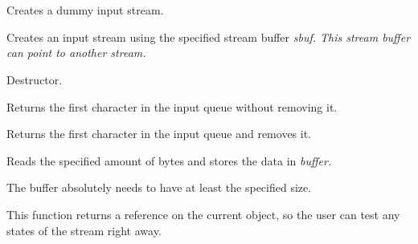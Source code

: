 \section{}\label{wxinputstream}







Creates a dummy input stream.


Creates an input stream using the specified stream buffer \it{sbuf}. This
stream buffer can point to another stream.



Destructor.



Returns the first character in the input queue without removing it.



Returns the first character in the input queue and removes it.



Reads the specified amount of bytes and stores the data in \it{buffer}.


The buffer absolutely needs to have at least the specified size.


This function returns a reference on the current object, so the user can test
any states of the stream right away.

